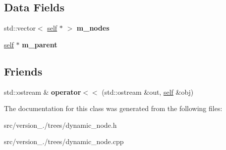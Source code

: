 \subsection*{Data Fields}
\begin{DoxyCompactItemize}
\item 
\mbox{\label{classez_1_1trees_1_1DynamicNode_aa64bd46a4f52ee22e4e78dbfc08a1fb0}} 
std\+::vector$<$ \hyperlink{classez_1_1trees_1_1DynamicNode}{self} $\ast$ $>$ {\bfseries m\+\_\+nodes}
\item 
\mbox{\label{classez_1_1trees_1_1DynamicNode_acef521e8514b8c7d3c5e6577e8766580}} 
\hyperlink{classez_1_1trees_1_1DynamicNode}{self} $\ast$ {\bfseries m\+\_\+parent}
\end{DoxyCompactItemize}
\subsection*{Friends}
\begin{DoxyCompactItemize}
\item 
\mbox{\label{classez_1_1trees_1_1DynamicNode_aa1d826e7fbedbc2b2358e08bc03fc894}} 
std\+::ostream \& {\bfseries operator$<$$<$} (std\+::ostream \&out, \hyperlink{classez_1_1trees_1_1DynamicNode}{self} \&obj)
\end{DoxyCompactItemize}


The documentation for this class was generated from the following files\+:\begin{DoxyCompactItemize}
\item 
src/version\+\_./trees/dynamic\+\_\+node.\+h\item 
src/version\+\_./trees/dynamic\+\_\+node.\+cpp\end{DoxyCompactItemize}
